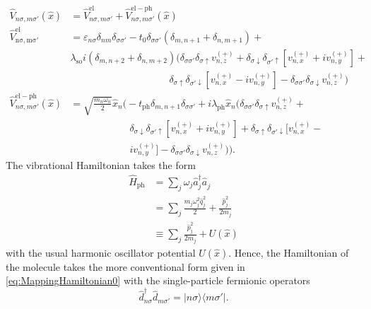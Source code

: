 \documentclass{article}
\newcommand{\pdagger}{{\phantom{\dagger}}}
\newcommand{\state}[1]{\vert #1\rangle}
\newcommand{\cstate}[1]{\langle #1\vert}
\begin{document}
\begin{equation}
	\begin{split}
		\hat{V}_{n\sigma,m\sigma'}(\hat{x}) &= \hat{V}_{n\sigma,m\sigma'}^\mathrm{el} +  \hat{V}_{n\sigma,m\sigma'}^\mathrm{el-ph}(\hat{x})\\
		\hat{V}_\mathrm{n\sigma,m\sigma'}^\mathrm{el}&= \varepsilon_{n\sigma}\delta_{nm}\delta_{\sigma\sigma'} - t_0 \delta_{\sigma\sigma'}(\delta_{m,n+1} + \delta_{n,m+1}) +\\
		& \lambda_\mathrm{so}i(\delta_{m,n+2}+\delta_{n,m+2})(\delta_{\sigma\sigma'}\delta_{\sigma\uparrow} v_{n,z}^{(+)} +  \delta_{\sigma\downarrow}\delta_{\sigma'\uparrow}[v_{n,x }^{(+)} + iv_{n,y }^{(+)}]+ \\
		& \qquad\qquad\qquad\qquad\qquad \delta_{\sigma\uparrow}\delta_{\sigma'\downarrow}[v_{n,x }^{(+)} - iv_{n,y }^{(+)}] - \delta_{\sigma\sigma'}\delta_{\sigma\downarrow}v_{n,z}^{(+)})\\
		\hat{V}^\mathrm{el-ph}_{n\sigma,m\sigma'}(\hat{x}) &= \sqrt{\frac{m_n \omega_n}{2}}\hat{x}_n\big( -t_\mathrm{ph} \delta_{m,n+1}\delta_{\sigma\sigma'} 
		+ i\lambda_\mathrm{ph}\hat{x}_n (\delta_{\sigma\sigma'}\delta_{\sigma\uparrow} v_{n,z}^{(+)} +\\   
		& \qquad\qquad\qquad \delta_{\sigma\downarrow}\delta_{\sigma'\uparrow}[v_{n,x }^{(+)} + iv_{n,y }^{(+)}]+\delta_{\sigma\uparrow}\delta_{\sigma'\downarrow}[v_{n,x }^{(+)} - \\
		& \qquad\qquad\qquad  iv_{n,y }^{(+)}] - \delta_{\sigma\sigma'}\delta_{\sigma\downarrow}v_{n,z}^{(+)})\big).
	\end{split}
\end{equation} 
The vibrational Hamiltonian takes the form  
\begin{equation}
	\begin{split}
		\hat{H}_\mathrm{ph} &= \sum_j \omega_j \hat{a}_j^\dagger \hat{a}^\pdagger_j \\
		&= \sum_j \frac{m_j \omega_j^2\hat{q}_j^2}{2} + \frac{\hat{p}_j^2}{2m_j}\\
		&\equiv \sum_j \frac{\hat{p}_j^2}{2m_j} + U(\hat{x})
	\end{split}
\end{equation}
with the usual harmonic oscillator potential $U(\hat{x})$.
Hence, the Hamiltonian of the molecule takes the more conventional form given in \cref{eq:MappingHamiltonian0} with the single-particle fermionic operators 
\begin{equation}
	\hat{d}^\dagger_{n\sigma}\hat{d}^\pdagger_{m\sigma'} = \state{n\sigma}\cstate{m\sigma'}.
\end{equation}
\end{document}
